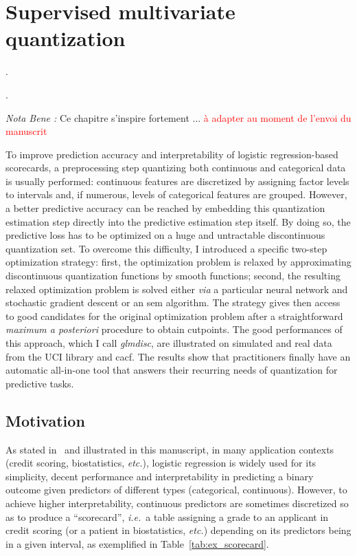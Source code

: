 \chapter{Supervised multivariate quantization} \label{chap4}

\epigraph{.}{.}

\minitoc

\textit{Nota Bene :} Ce chapitre s'inspire fortement ... \textcolor{red}{à adapter au moment de l'envoi du manuscrit}

\bigskip


To improve prediction accuracy and interpretability of logistic regression-based scorecards, a preprocessing step quantizing both continuous and categorical data is usually performed: continuous features are discretized by assigning factor levels to intervals and, if numerous, levels of categorical features are grouped. However, a better predictive accuracy can be reached by embedding this quantization estimation step directly into the predictive estimation step itself. By doing so, the predictive loss has to be optimized on a huge and untractable discontinuous quantization set. To overcome this difficulty, I introduced a specific two-step optimization strategy: first, the optimization problem is relaxed by approximating discontinuous quantization functions by smooth functions; second, the resulting relaxed optimization problem is solved either \textit{via} a particular neural network and stochastic gradient descent or an \gls{sem} algorithm. The strategy gives then access to good candidates for the original optimization problem after a straightforward \textit{maximum a posteriori} procedure to obtain cutpoints. The good performances of this approach, which I call \textit{glmdisc}, are illustrated on simulated and real data from the UCI library and \gls{cacf}. The results show that practitioners finally have an automatic all-in-one tool that answers their recurring needs of quantization for predictive tasks.
 
\section{Motivation}

As stated in~\cite{hosmer2013applied} and illustrated in this manuscript, in many application contexts (credit scoring, biostatistics, {\it etc.}), logistic regression is widely used for its simplicity, decent performance and interpretability in predicting a binary outcome given predictors of different types (categorical, continuous). However, to achieve  higher interpretability, continuous predictors are sometimes discretized so as to produce a ``scorecard'', \textit{i.e.}\ a table assigning a grade to an applicant in credit scoring (or a patient in biostatistics, {\it etc.}) depending on its predictors being in a given interval, as exemplified in Table~\ref{tab:ex_scorecard}.

